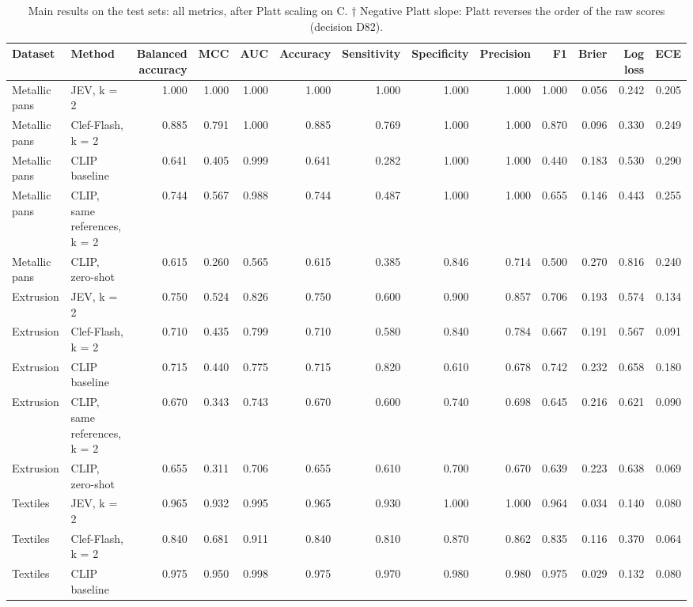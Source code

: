 \begin{table}

\caption{\label{tab:tbl-main}Main results on the test sets: all metrics, after Platt scaling on C. † Negative Platt slope: Platt reverses the order of the raw scores (decision D82).}
\centering
\begin{tabular}[t]{llrrrrrrrrrrr}
\toprule
Dataset & Method & Balanced accuracy & MCC & AUC & Accuracy & Sensitivity & Specificity & Precision & F1 & Brier & Log loss & ECE\\
\midrule
Metallic pans & JEV, k = 2 & 1.000 & 1.000 & 1.000 & 1.000 & 1.000 & 1.000 & 1.000 & 1.000 & 0.056 & 0.242 & 0.205\\
Metallic pans & Clef-Flash, k = 2 & 0.885 & 0.791 & 1.000 & 0.885 & 0.769 & 1.000 & 1.000 & 0.870 & 0.096 & 0.330 & 0.249\\
Metallic pans & CLIP baseline & 0.641 & 0.405 & 0.999 & 0.641 & 0.282 & 1.000 & 1.000 & 0.440 & 0.183 & 0.530 & 0.290\\
Metallic pans & CLIP, same references, k = 2 & 0.744 & 0.567 & 0.988 & 0.744 & 0.487 & 1.000 & 1.000 & 0.655 & 0.146 & 0.443 & 0.255\\
Metallic pans & CLIP, zero-shot & 0.615 & 0.260 & 0.565 & 0.615 & 0.385 & 0.846 & 0.714 & 0.500 & 0.270 & 0.816 & 0.240\\
\addlinespace
Extrusion & JEV, k = 2 & 0.750 & 0.524 & 0.826 & 0.750 & 0.600 & 0.900 & 0.857 & 0.706 & 0.193 & 0.574 & 0.134\\
Extrusion & Clef-Flash, k = 2 & 0.710 & 0.435 & 0.799 & 0.710 & 0.580 & 0.840 & 0.784 & 0.667 & 0.191 & 0.567 & 0.091\\
Extrusion & CLIP baseline & 0.715 & 0.440 & 0.775 & 0.715 & 0.820 & 0.610 & 0.678 & 0.742 & 0.232 & 0.658 & 0.180\\
Extrusion & CLIP, same references, k = 2 & 0.670 & 0.343 & 0.743 & 0.670 & 0.600 & 0.740 & 0.698 & 0.645 & 0.216 & 0.621 & 0.090\\
Extrusion & CLIP, zero-shot & 0.655 & 0.311 & 0.706 & 0.655 & 0.610 & 0.700 & 0.670 & 0.639 & 0.223 & 0.638 & 0.069\\
\addlinespace
Textiles & JEV, k = 2 & 0.965 & 0.932 & 0.995 & 0.965 & 0.930 & 1.000 & 1.000 & 0.964 & 0.034 & 0.140 & 0.080\\
Textiles & Clef-Flash, k = 2 & 0.840 & 0.681 & 0.911 & 0.840 & 0.810 & 0.870 & 0.862 & 0.835 & 0.116 & 0.370 & 0.064\\
Textiles & CLIP baseline & 0.975 & 0.950 & 0.998 & 0.975 & 0.970 & 0.980 & 0.980 & 0.975 & 0.029 & 0.132 & 0.080\\

\end{tabular}
\end{table}
